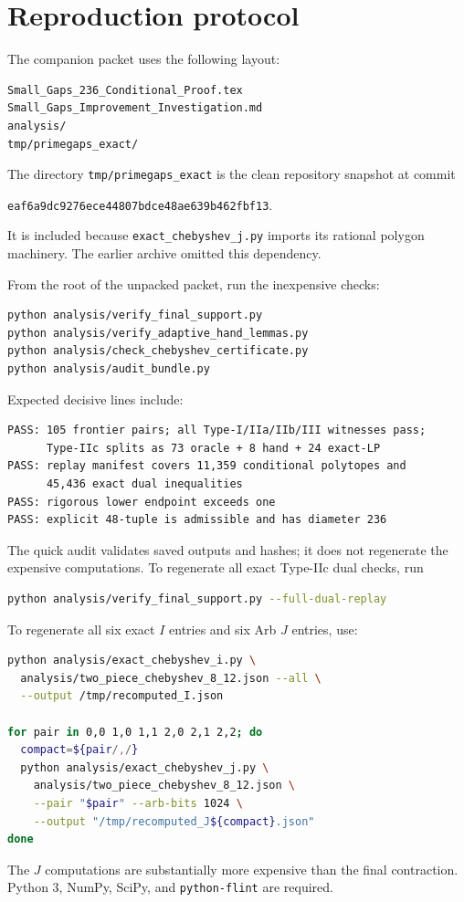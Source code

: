 \documentclass[11pt]{article}
\theoremstyle{definition}
\theoremstyle{remark}
\begin{document}
\section{Reproduction protocol}
\label{sec:reproduction}

The companion packet uses the following layout:
\begin{lstlisting}
Small_Gaps_236_Conditional_Proof.tex
Small_Gaps_Improvement_Investigation.md
analysis/
tmp/primegaps_exact/
\end{lstlisting}
The directory \texttt{tmp/primegaps\_exact} is the clean repository snapshot
at commit
\begin{center}
\texttt{eaf6a9dc9276ece44807bdce48ae639b462fbf13}.
\end{center}
It is included because \texttt{exact\_chebyshev\_j.py} imports its rational
polygon machinery.  The earlier archive omitted this dependency.

From the root of the unpacked packet, run the inexpensive checks:
\begin{lstlisting}[language=bash]
python analysis/verify_final_support.py
python analysis/verify_adaptive_hand_lemmas.py
python analysis/check_chebyshev_certificate.py
python analysis/audit_bundle.py
\end{lstlisting}
Expected decisive lines include:
\begin{lstlisting}
PASS: 105 frontier pairs; all Type-I/IIa/IIb/III witnesses pass;
      Type-IIc splits as 73 oracle + 8 hand + 24 exact-LP
PASS: replay manifest covers 11,359 conditional polytopes and
      45,436 exact dual inequalities
PASS: rigorous lower endpoint exceeds one
PASS: explicit 48-tuple is admissible and has diameter 236
\end{lstlisting}

The quick audit validates saved outputs and hashes; it does not regenerate the
expensive computations.  To regenerate all exact Type-IIc dual checks, run
\begin{lstlisting}[language=bash]
python analysis/verify_final_support.py --full-dual-replay
\end{lstlisting}
To regenerate all six exact \(I\) entries and six Arb \(J\) entries, use:
\begin{lstlisting}[language=bash]
python analysis/exact_chebyshev_i.py \
  analysis/two_piece_chebyshev_8_12.json --all \
  --output /tmp/recomputed_I.json

for pair in 0,0 1,0 1,1 2,0 2,1 2,2; do
  compact=${pair/,/}
  python analysis/exact_chebyshev_j.py \
    analysis/two_piece_chebyshev_8_12.json \
    --pair "$pair" --arb-bits 1024 \
    --output "/tmp/recomputed_J${compact}.json"
done
\end{lstlisting}
The \(J\) computations are substantially more expensive than the final
contraction.  Python 3, NumPy, SciPy, and \texttt{python-flint} are required.
\end{document}
